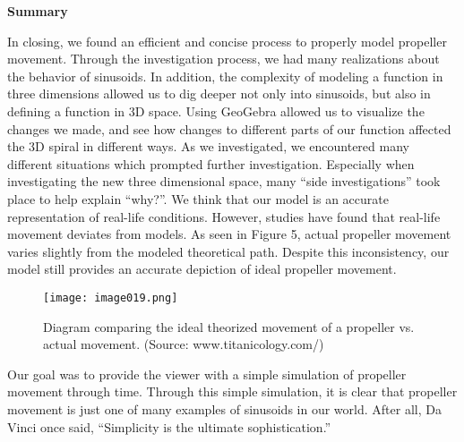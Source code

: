\noindent
\textbf{Summary}

In closing, we found an efficient and concise process to properly model propeller movement. Through the investigation process, we had many realizations about the behavior of sinusoids. In addition, the complexity of modeling a function in three dimensions allowed us to dig deeper not only into sinusoids, but also in defining a function in 3D space. Using GeoGebra allowed us to visualize the changes we made, and see how changes to different parts of our function affected the 3D spiral in different ways. As we investigated, we encountered many different situations which prompted further investigation. Especially when investigating the new three dimensional space, many “side investigations” took place to help explain “why?”. We think that our model is an accurate representation of real-life conditions. However, studies have found that real-life movement deviates from models. As seen in Figure 5, actual propeller movement varies slightly from the modeled theoretical path. Despite this inconsistency, our model still provides an accurate depiction of ideal propeller movement.

\renewcommand{\thefigure}{5}
\begin{figure}[h]
\texttt{[image: image019.png]}
\caption{Diagram comparing the ideal theorized movement of a propeller vs. actual movement. (Source: www.titanicology.com/)}
\label{fig:real}
\end{figure}

Our goal was to provide the viewer with a simple simulation of propeller movement through time. Through this simple simulation, it is clear that propeller movement is just one of many examples of sinusoids in our world. After all, Da Vinci once said, “Simplicity is the ultimate sophistication.”